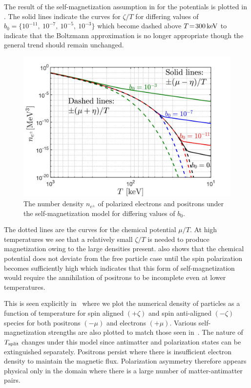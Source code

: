 The result of the self-magnetization assumption in  for the potentials is plotted in . The solid lines indicate the curves for $\zeta/T$ for differing values of $b_{0}=\{10^{-11},\ 10^{-7},\ 10^{-5},\ 10^{-3}\}$ which become dashed above $T\!=\!300\text{\,keV}$ to indicate that the Boltzmann approximation is no longer appropriate though the general trend should remain unchanged.

\begin{figure}[ht]
 \centering
 \includegraphics[width=0.90\linewidth]{plots/ElectronDensity_SpinChemicalPotential004.jpg}
 \caption{The number density $n_{e^{\pm}}$ of polarized electrons and positrons under the self-magnetization model for differing values of $b_{0}$. }
 \label{fig:polarswap} 
\end{figure}

The dotted lines are the curves for the chemical potential $\mu/T$. At high temperatures we see that a relatively small $\zeta/T$ is needed to produce magnetization owing to the large densities present.  also shows that the chemical potential does not deviate from the free particle case until the spin polarization becomes sufficiently high which indicates that this form of self-magnetization would require the annihilation of positrons to be incomplete even at lower temperatures.

This is seen explicitly in~ where we plot the numerical density of particles as a function of temperature for spin aligned $(+\zeta)$ and spin anti-aligned $(-\zeta)$ species for both positrons $(-\mu)$ and electrons $(+\mu)$. Various self-magnetization strengths are also plotted to match those seen in~. The nature of $T_{\rm split}$ changes under this model since antimatter and polarization states can be extinguished separately. Positrons persist where there is insufficient electron density to maintain the magnetic flux. Polarization asymmetry therefore appears physical only in the domain where there is a large number of matter-antimatter pairs.

